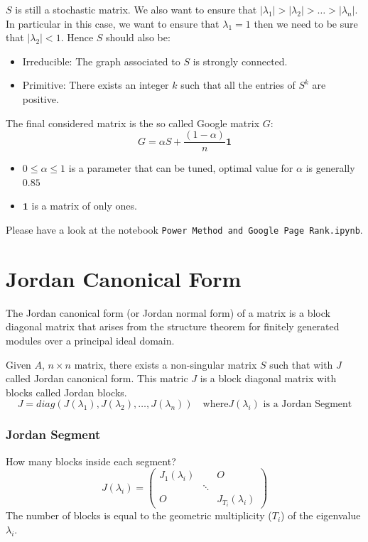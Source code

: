 $S$ is still a stochastic matrix.
We also want to ensure that $|\lambda_1| > |\lambda_2| > \ldots > |\lambda_n|$.
In particular in this case, we want to ensure that $\lambda_1 = 1$ then we need to be sure that $|\lambda_2| < 1$.
Hence $S$ should also be:
\begin{itemize}
\item Irreducible: The graph associated to $S$ is strongly connected.
\item Primitive: There exists an integer $k$ such that all the entries of $S^k$ are positive.
\end{itemize}

The final considered matrix is the so called Google matrix $G$:
$$G = \alpha S + \frac{(1 - \alpha)}{n} \mathbf{1}$$
\begin{itemize}
    \item $0 \leq \alpha \leq 1$ is a parameter that can be tuned, optimal value for $\alpha$ is generally $0.85$
    \item $\mathbf{1}$ is a matrix of only ones.
\end{itemize}

Please have a look at the notebook \texttt{Power Method and Google Page Rank.ipynb}.

\section{Jordan Canonical Form}
The Jordan canonical form (or Jordan normal form) of a matrix is a block diagonal matrix that arises from the structure theorem for finitely generated modules over a principal ideal domain.

Given $A$, $n \times n$ matrix, there exists a non-singular matrix $S$ such that with $J$ called Jordan canonical form.
This matric $J$ is a block diagonal matrix with blocks called Jordan blocks.
$$ J = diag(J(\lambda_1), J(\lambda_2), \ldots, J(\lambda_n)) \quad \text{where} J(\lambda_i) \text{ is a Jordan Segment} $$
\subsubsection{Jordan Segment}
How many blocks inside each segment?
$$ J(\lambda_i) = \begin{pmatrix}
J_1(\lambda_i) & & O \\
& \ddots & \\
O & & J_{T_i}(\lambda_i)
\end{pmatrix}
$$
The number of blocks is equal to the geometric multiplicity ($T_i$) of the eigenvalue $\lambda_i$.

